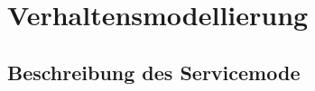 

\section{Verhaltensmodellierung}\label{sec:verhaltensmodellierung}

\subsection{Beschreibung des Servicemode}\label{subsec:beschreibung-des-servicemode}

